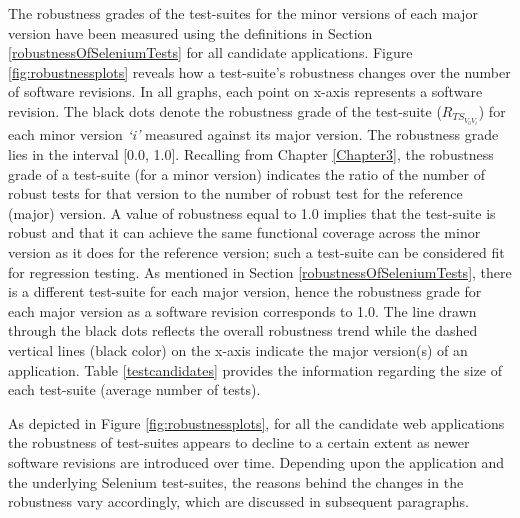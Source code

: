   
The robustness grades of the test-suites for the minor versions of each major version have been measured using the definitions in Section \ref{robustnessOfSeleniumTests} for all candidate applications. Figure \ref{fig:robustnessplots} reveals how a test-suite's robustness changes over the number of software revisions. In all graphs, each point on x-axis represents a software revision. The black dots denote the robustness grade of the test-suite ($R_{TS_{V_{0}V_{i}}}$) for each minor version \textit{`i'} measured against its major version. The robustness grade lies in the interval [0.0, 1.0]. Recalling from Chapter \ref{Chapter3}, the robustness grade of a test-suite (for a minor version) indicates the ratio of the number of robust tests for that version to the number of robust test for the reference (major) version. A value of robustness equal to 1.0 implies that the test-suite is robust and that it can achieve the same functional coverage across the minor version as it does for the reference version; such a test-suite can be considered fit for regression testing. As mentioned in Section \ref{robustnessOfSeleniumTests}, there is a different test-suite for each major version, hence the robustness grade for each major version as a software revision corresponds to 1.0. The line drawn through the black dots reflects the overall robustness trend while the dashed vertical lines (black color) on the x-axis indicate the major version(s) of an application. Table \ref{testcandidates} provides the information regarding the size of each test-suite (average number of tests).

As depicted in Figure \ref{fig:robustnessplots}, for all the candidate web applications the robustness of test-suites appears to decline to a certain extent as newer software revisions are introduced over time. Depending upon the application and the underlying Selenium test-suites, the reasons behind the changes in the robustness vary accordingly, which are discussed in subsequent paragraphs. 

